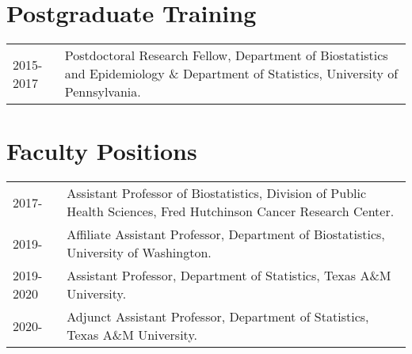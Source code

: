 \documentclass[10pt]{article}
\begin{document}

\section{Postgraduate Training} 
\begin{table}[H]
\hskip0.9cm\begin{tabular}{p{1.6cm}p{12cm}}
2015-2017 & Postdoctoral Research Fellow, {Department of Biostatistics and Epidemiology} \& {Department of Statistics}, University of Pennsylvania. %
\end{tabular}
\end{table}


\section{Faculty Positions} 
\begin{table}[H]
\hskip0.9cm\begin{tabular}{p{1.6cm}p{12cm}}
2017- & Assistant Professor of Biostatistics, Division of Public Health Sciences, Fred Hutchinson Cancer Research Center. \\
2019- & Affiliate Assistant Professor, Department of Biostatistics, University of Washington.  \\
2019-2020  & Assistant Professor, Department of Statistics, Texas A\&M University.\\
2020- & Adjunct Assistant Professor, Department of Statistics, Texas A\&M University.
\end{tabular}
\end{table}
\end{document}
